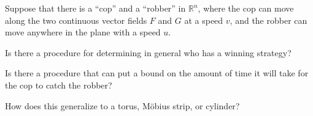 \documentclass{article}
\begin{document}
Suppose that there is a ``cop'' and a ``robber'' in $\mathbb{R}^n$, where the
cop can move along the two continuous vector fields $F$ and $G$ at a speed
$v$, and the robber can move anywhere in the plane with a speed $u$.
\begin{question}
  Is there a procedure for determining in general who has a winning strategy?
\end{question}
\begin{related}
  \item Is there a procedure that can put a bound on the amount of time it will
    take for the cop to catch the robber?
  \item How does this generalize to a torus, M\"obius strip, or cylinder?
\end{related}
\end{document}
